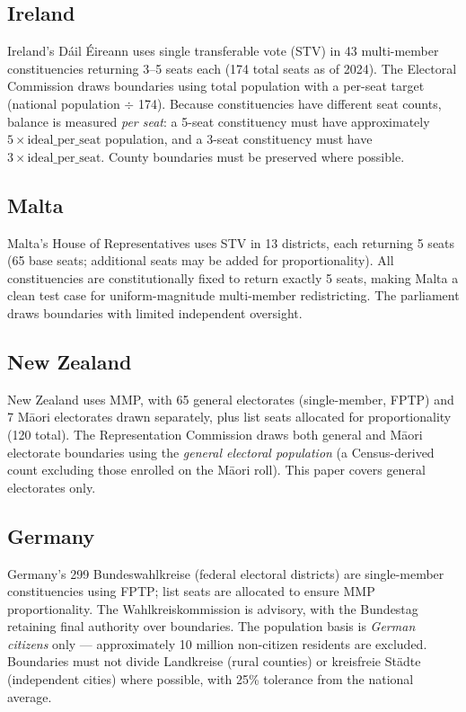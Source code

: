 \subsection{Ireland}

Ireland's Dáil Éireann uses single transferable vote (STV) in 43 multi-member constituencies returning 3--5 seats each (174 total seats as of 2024). The Electoral Commission draws boundaries using total population with a per-seat target (national population $\div$ 174). Because constituencies have different seat counts, balance is measured \emph{per seat}: a 5-seat constituency must have approximately $5 \times \text{ideal\_per\_seat}$ population, and a 3-seat constituency must have $3 \times \text{ideal\_per\_seat}$. County boundaries must be preserved where possible.

\subsection{Malta}

Malta's House of Representatives uses STV in 13 districts, each returning 5 seats (65 base seats; additional seats may be added for proportionality). All constituencies are constitutionally fixed to return exactly 5 seats, making Malta a clean test case for uniform-magnitude multi-member redistricting. The parliament draws boundaries with limited independent oversight.

\subsection{New Zealand}

New Zealand uses MMP, with 65 general electorates (single-member, FPTP) and 7 Māori electorates drawn separately, plus list seats allocated for proportionality (120 total). The Representation Commission draws both general and Māori electorate boundaries using the \emph{general electoral population} (a Census-derived count excluding those enrolled on the Māori roll). This paper covers general electorates only.

\subsection{Germany}

Germany's 299 Bundeswahlkreise (federal electoral districts) are single-member constituencies using FPTP; list seats are allocated to ensure MMP proportionality. The Wahlkreiskommission is advisory, with the Bundestag retaining final authority over boundaries. The population basis is \emph{German citizens} only --- approximately 10 million non-citizen residents are excluded. Boundaries must not divide Landkreise (rural counties) or kreisfreie Städte (independent cities) where possible, with 25\% tolerance from the national average.

